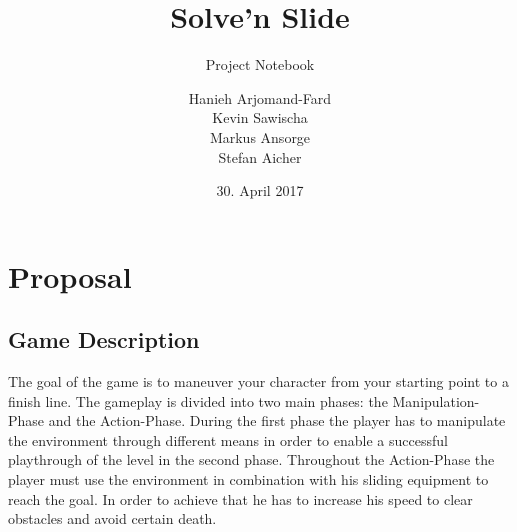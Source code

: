 \documentclass[12pt, letterpaper]{scrartcl}
\title{Solve'n Slide}
\subtitle{Project Notebook}
\author{Hanieh Arjomand-Fard\\Kevin Sawischa\\Markus Ansorge\\Stefan Aicher}
\date{30. April 2017}
\begin{document}
	
	\begin{titlepage}
		\maketitle
	\end{titlepage}
	
	\tableofcontents
	\newpage
	
	\section{Proposal}
	\subsection{Game Description}
	The goal of the game is to maneuver your character from your starting point to a finish line. The gameplay is divided into two main phases: the Manipulation-Phase and the Action-Phase. During the first phase the player has to manipulate the environment through different means in order to enable a successful playthrough of the level in the second phase. Throughout the Action-Phase the player must use the environment in combination with his sliding equipment to reach the goal. In order to achieve that he has to increase his speed to clear obstacles and avoid certain death.
	
\end{document}
